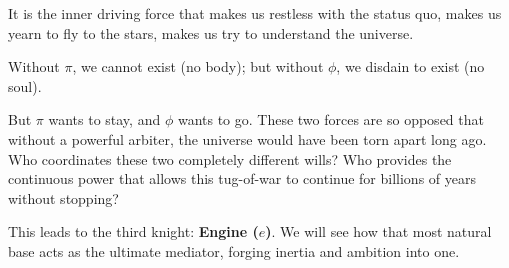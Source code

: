 It is the inner driving force that makes us restless with the status quo, makes us yearn to fly to the stars, makes us try to understand the universe.

Without $\pi$, we cannot exist (no body); but without $\phi$, we disdain to exist (no soul).

But $\pi$ wants to stay, and $\phi$ wants to go. These two forces are so opposed that without a powerful arbiter, the universe would have been torn apart long ago. Who coordinates these two completely different wills? Who provides the continuous power that allows this tug-of-war to continue for billions of years without stopping?

This leads to the third knight: \textbf{Engine ($e$)}. We will see how that most natural base acts as the ultimate mediator, forging inertia and ambition into one.


